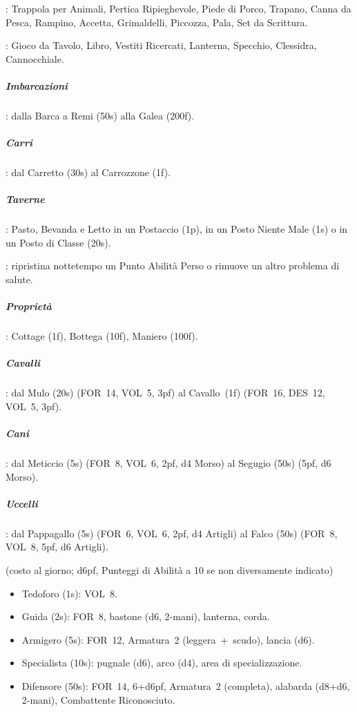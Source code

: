 \documentclass[itdr]{subfiles}
\begin{document}
: Trappola per Animali, Pertica Ripieghevole, Piede di Porco, Trapano, Canna da Pesca, Rampino, Accetta, Grimaldelli, Piccozza, Pala, Set da Scrittura.

: Gioco da Tavolo, Libro, Vestiti Ricercati, Lanterna, Specchio, Clessidra, Cannocchiale.

\vfill

\subparagraph{Imbarcazioni}: dalla Barca a Remi (50s) alla Galea (200f).

\subparagraph{Carri}: dal Carretto (30s) al Carrozzone (1f).

\subparagraph{Taverne}: Pasto, Bevanda e Letto in un Postaccio (1p), in un Posto Niente Male (1s) o in un Posto di Classe (20s).

: ripristina nottetempo un Punto Abilità Perso o rimuove un altro problema di salute.

\subparagraph{Proprietà}: Cottage (1f), Bottega (10f), Maniero (100f).

\subparagraph{Cavalli}: dal Mulo (20s) (FOR~14, VOL~5, 3pf) al Cavallo~(1f) (FOR~16, DES~12, VOL~5, 3pf).

\subparagraph{Cani}: dal Meticcio (5s) (FOR~8, VOL~6, 2pf, d4 Morso) al Segugio (50s) (5pf, d6 Morso).

\subparagraph{Uccelli}: dal Pappagallo (5s) (FOR~6, VOL~6, 2pf, d4 Artigli) al Falco (50s) (FOR~8, VOL~8, 5pf, d6 Artigli).

\vfill

 (costo al giorno; d6pf, Punteggi di Abilità a 10
se non diversamente indicato)

\begin{itemize}
	\item Tedoforo (1s): VOL~8.
	\item Guida (2s): FOR~8, bastone (d6, 2-mani), lanterna, corda.
	\item Armigero (5s): FOR~12, Armatura~2 \mbox{(leggera + scudo)}, lancia (d6).
	\item Specialista (10s): pugnale (d6), arco (d4), area di specializzazione.
	\item Difensore (50s): FOR~14, 6+d6pf, Armatura~2 (completa), alabarda (d8+d6, 2-mani), Combattente Riconosciuto.
\end{itemize}


\end{document}
